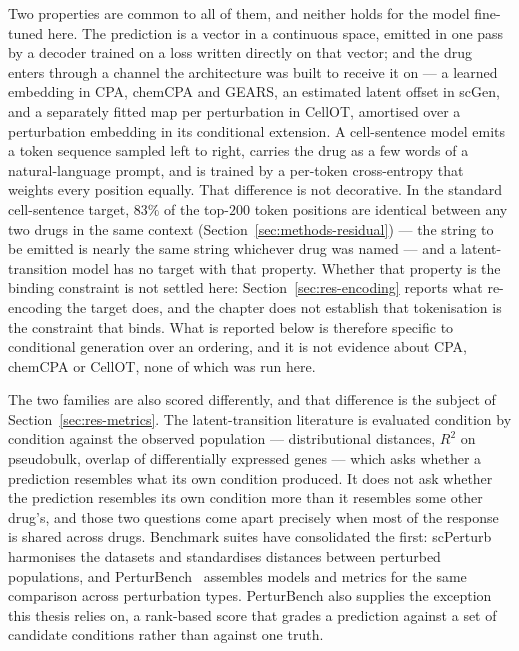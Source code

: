 Two properties are common to all of them, and neither holds for the model fine-tuned here. The
prediction is a vector in a continuous space, emitted in one pass by a decoder trained on a loss
written directly on that vector; and the drug enters through a channel the architecture was built
to receive it on --- a learned embedding in CPA, chemCPA and GEARS, an estimated latent offset in
scGen, and a separately fitted map per perturbation in CellOT, amortised over a perturbation
embedding in its conditional extension. A cell-sentence model emits a token sequence sampled left to right, carries the
drug as a few words of a natural-language prompt, and is trained by a per-token cross-entropy that
weights every position equally. That difference is not decorative. In the standard
cell-sentence target, $83\%$ of the top-$200$ token positions are identical between any two drugs
in the same context (Section~\ref{sec:methods-residual}) --- the string to be emitted is nearly the
same string whichever drug was named --- and a latent-transition model has no target with that
property. Whether that property is the binding constraint is not settled here:
Section~\ref{sec:res-encoding} reports what re-encoding the target does, and the chapter does not
establish that tokenisation is the constraint that binds. What is reported below is therefore
specific to conditional generation over an ordering, and it is not evidence about CPA, chemCPA or
CellOT, none of which was run here.

The two families are also scored differently, and that difference is the subject of
Section~\ref{sec:res-metrics}. The latent-transition literature is evaluated condition by condition
against the observed population --- distributional distances, $R^2$ on pseudobulk, overlap of
differentially expressed genes --- which asks whether a prediction resembles what its own condition
produced. It does not ask whether the prediction resembles its own condition more than it resembles
some other drug's, and those two questions come apart precisely when most of the response is shared
across drugs. Benchmark suites have consolidated the first: scPerturb~\cite{scperturb} harmonises
the datasets and standardises distances between perturbed populations, and
PerturBench~\cite{perturbench} assembles models and metrics for the same comparison across
perturbation types. PerturBench also supplies the exception this thesis relies on, a rank-based
score that grades a prediction against a set of candidate conditions rather than against one truth.

